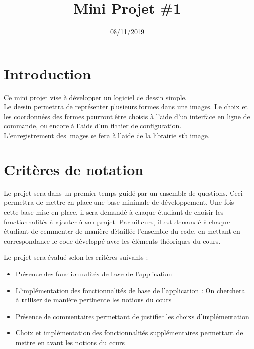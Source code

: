 \documentclass[
	12pt, %
]{fphw}
\title{Mini Projet \#1} %
\author{} %
\date{08/11/2019} %
\institute{ISEN Marseille} %
\begin{document}
\maketitle %


\section*{Introduction}

Ce mini projet vise à développer un logiciel de dessin simple.\\

Le dessin permettra de représenter plusieurs formes dans une images. Le choix et les coordonnées des formes pourront être choisis à l'aide d'un interface en ligne de commande, ou encore à l'aide d'un fichier de configuration.\\

L'enregistrement des images se fera à l'aide de la librairie stb image.


\section*{Critères de notation}

Le projet sera dans un premier temps guidé par un ensemble de questions. Ceci permettra de mettre en place une base minimale de développement.
Une fois cette base mise en place, il sera demandé à chaque étudiant de choisir les fonctionnalités à ajouter à son projet. Par ailleurs, il est demandé à chaque étudiant de commenter de manière détaillée l'ensemble du code, en mettant en correspondance le code développé avec les éléments théoriques du cours.


Le projet sera évalué selon les critères suivants :
\begin{itemize}
	\item Présence des fonctionnalités de base de l'application
	\item L'implémentation des fonctionnalités de base de l'application : On cherchera à utiliser de manière pertinente les notions du cours
	\item Présence de commentaires permettant de justifier les choixs d'implémentation
	\item Choix et implémentation des fonctionnalités supplémentaires permettant de mettre en avant les notions du cours
\end{itemize}
\end{document}
